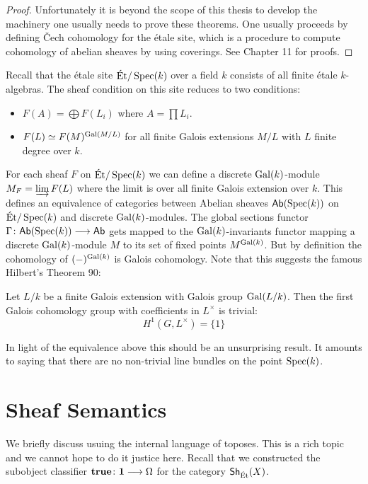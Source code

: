 \begin{proof}
	Unfortunately it is beyond the scope of this thesis to develop the machinery one usually needs to prove these theorems. One usually proceeds by defining \v{C}ech cohomology for the \'etale site, which is a procedure to compute cohomology of abelian sheaves by using coverings. See \cite{milneLEC} Chapter 11 for proofs.
\end{proof}

\begin{remark}
	Recall that the \'etale site $\text{\'Et}/\operatorname{Spec}(k)$ over a field $k$ consists of all finite \'etale $k$-algebras. The sheaf condition on this site reduces to two conditions:
	\begin{itemize}
		\item $F(A) = \bigoplus F(L_i)$ where $A = \prod L_i$.
		\item $F(L) \simeq F(M)^{\operatorname{Gal}(M/L)}$ for all finite Galois extensions $M/L$ with $L$ finite degree over $k$.
	\end{itemize}
	For each sheaf $F$ on $\text{\'Et}/\operatorname{Spec}(k)$ we can define a discrete $\operatorname{Gal}(k)$-module $M_F = \varinjlim F(L)$ where the limit is over all finite Galois extension over $k$. This defines an equivalence of categories between Abelian sheaves $\mathsf{Ab}(\operatorname{Spec}(k))$ on $\text{\'Et}/\operatorname{Spec}(k)$ and discrete $\operatorname{Gal}(k)$-modules. The global sections functor $\Gamma \colon \mathsf{Ab}(\operatorname{Spec}(k)) \longrightarrow \mathsf{Ab}$ gets mapped to the $\operatorname{Gal}(k)$-invariants functor mapping a discrete $\operatorname{Gal}(k)$-module $M$ to its set of fixed points $M^{\operatorname{Gal}(k)}$. But by definition the cohomology of $(-)^{\operatorname{Gal}(k)}$ is Galois cohomology. Note that this suggests the famous Hilbert's Theorem 90:
	\begin{theorem}
		Let $L/k$ be a finite Galois extension with Galois group $\operatorname{Gal}(L/k)$. Then the first Galois cohomology group with coefficients in $L^\times$ is trivial:
		\[
			H^1(G,L^\times)= \{1\}
		\]
	\end{theorem}
	In light of the equivalence above this should be an unsurprising result. It amounts to saying that there are no non-trivial line bundles on the point $\operatorname{Spec}(k)$.
\end{remark}

\section{Sheaf Semantics}
We briefly discuss usuing the internal language of toposes. This is a rich topic and we cannot hope to do it justice here. Recall that we constructed the subobject classifier $\mathbf{true} \colon \mathbf{1} \longrightarrow \Omega$ for the category $\operatorname{\mathsf{Sh}}_{\text{\'Et}}(X)$.

